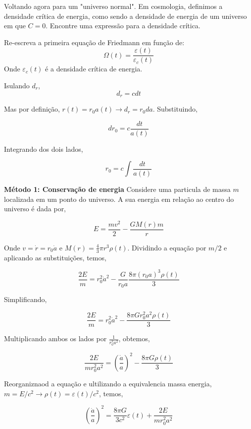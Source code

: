 \documentclass[11pt]{article}
\begin{document}
\begin{pproblem}
\begin{enumerate}[label=\roman*)]
\begin{alternativas}
            \item Voltando agora para um "universo normal". Em cosmologia, definimos a densidade crítica de energia, como sendo a densidade de energia de um universo em que \(C = 0\). Encontre uma expressão para a densidade crítica.
            \item Re-escreva a primeira equação de Friedmann em função de:
            \[\Omega(t) = \frac{\varepsilon(t)}{\varepsilon_c(t)}\]
            Onde \(\varepsilon_c(t)\) é a densidade crítica de energia.
        \end{alternativas}
    \end{enumerate}
\begin{pssolution*}{}{}
    \begin{alternativas}
        \item Isulando \(d_r\), 
        \[d_r = cdt\]

        Mas por definição, \(r(t) = r_0a(t) \rightarrow d_r = r_0da\). Substituindo, 

        \[dr_0 = c\frac{dt}{a(t)}\]

        Integrando dos dois lados, 

        \[r_0 = c\int\frac{dt}{a(t)}\]

        \item \textbf{Método 1: Conservação de energia}
        Considere uma particula de massa \(m\) localizada em um ponto do universo. A sua energia em relação ao centro do universo é dada por, 

        \[E = \frac{mv^2}{2} - \frac{GM(r)m}{r}\]

        Onde \(v = \dot{r} = r_0\dot{a}\) e \(M(r) = \frac{4}{3}\pi r^3\rho(t)\).  Dividindo a equação por \(m/2\) e aplicando as substituições, temos, 

        \[\frac{2E}{m} = r_0^2\dot{a}^2 - \frac{G}{r_0a}\frac{8\pi (r_0a)^3\rho(t)}{3}\]

        Simplificando, 

        \[\frac{2E}{m} = r_0^2\dot{a}^2 - \frac{8\pi G r_0^2a^2\rho(t)}{3}\]

        Multiplicando ambos os lados por \(\frac{1}{r_0^2a^2}\), obtemos, 

        \[\frac{2E}{mr_0^2a^2} = \left(\frac{\dot{a}}{a}\right)^2 - \frac{8\pi G\rho(t)}{3}\]

        Reorganiznaod a equação e ultilizando a equivalencia massa energia, \(m = E/c^2 \rightarrow \rho(t) = \varepsilon(t)/c^2\), temos, 

        \[\left(\frac{\dot{a}}{a}\right)^2 = \frac{8\pi G}{3 c^2}\varepsilon(t) + \frac{2E}{mr_0^2a^2}\]


\end{alternativas}
\end{pssolution*}
\end{pproblem}
\end{document}
